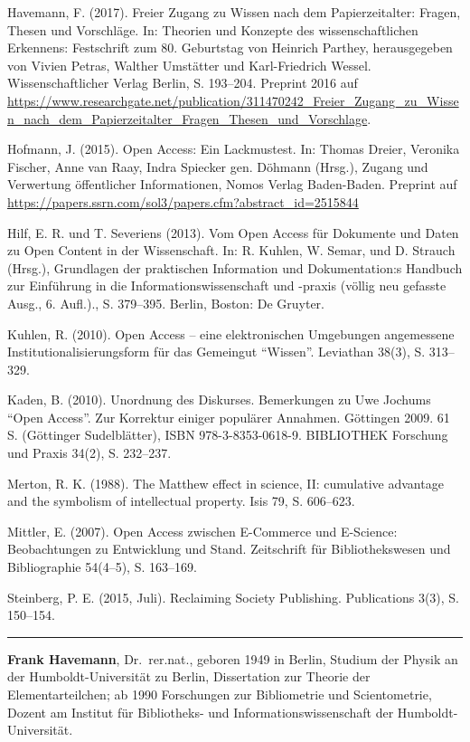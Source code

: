 \documentclass[a4paper,
fontsize=11pt,
oneside,
numbers=noperiodatend,
parskip=half-,
bibliography=totoc,
final
]{scrartcl}
\begin{document}
Havemann, F. (2017). Freier Zugang zu Wissen nach dem Papierzeitalter:
Fragen, Thesen und Vorschläge. In: Theorien und Konzepte des
wissenschaftlichen Erkennens: Festschrift zum 80. Geburtstag von
Heinrich Parthey, herausgegeben von Vivien Petras, Walther Umstätter und
Karl-Friedrich Wessel. Wissenschaftlicher Verlag Berlin, S. 193--204.
Preprint 2016 auf
\url{https://www.researchgate.net/publication/311470242_Freier_Zugang_zu_Wissen_nach_dem_Papierzeitalter_Fragen_Thesen_und_Vorschlage}.

Hofmann, J. (2015). Open Access: Ein Lackmustest. In: Thomas Dreier,
Veronika Fischer, Anne van Raay, Indra Spiecker gen. Döhmann (Hrsg.),
Zugang und Verwertung öffentlicher Informationen, Nomos Verlag
Baden-Baden. Preprint auf
\url{https://papers.ssrn.com/sol3/papers.cfm?abstract_id=2515844}

Hilf, E. R. und T. Severiens (2013). Vom Open Access für Dokumente und
Daten zu Open Content in der Wissenschaft. In: R. Kuhlen, W. Semar, und
D. Strauch (Hrsg.), Grundlagen der praktischen Information und
Dokumentation:s Handbuch zur Einführung in die Informationswissenschaft
und -praxis (völlig neu gefasste Ausg., 6. Aufl.)., S. 379--395. Berlin,
Boston: De Gruyter.

Kuhlen, R. (2010). Open Access -- eine elektronischen Umgebungen
angemessene Institutionalisierungsform für das Gemeingut
\enquote{Wissen}. Leviathan 38(3), S. 313--329.

Kaden, B. (2010). Unordnung des Diskurses. Bemerkungen zu Uwe Jochums
\enquote{Open Access}. Zur Korrektur einiger populärer Annahmen.
Göttingen 2009. 61 S. (Göttinger Sudelblätter), ISBN 978-3-8353-0618-9.
BIBLIOTHEK Forschung und Praxis 34(2), S. 232--237.

Merton, R. K. (1988). The Matthew effect in science, II: cumulative
advantage and the symbolism of intellectual property. Isis 79, S.
606--623.

Mittler, E. (2007). Open Access zwischen E-Commerce und E-Science:
Beobachtungen zu Entwicklung und Stand. Zeitschrift für Bibliothekswesen
und Bibliographie 54(4--5), S. 163--169.

Steinberg, P. E. (2015, Juli). Reclaiming Society Publishing.
Publications 3(3), S. 150--154.

\begin{center}\rule{0.5\linewidth}{\linethickness}\end{center}

\textbf{Frank Havemann}, Dr.~rer.nat., geboren 1949 in Berlin, Studium
der Physik an der Humboldt-Universität zu Berlin, Dissertation zur
Theorie der Elementarteilchen; ab 1990 Forschungen zur Bibliometrie und
Scientometrie, Dozent am Institut für Bibliotheks- und
Informationswissenschaft der Humboldt-Universität.
\end{document}
